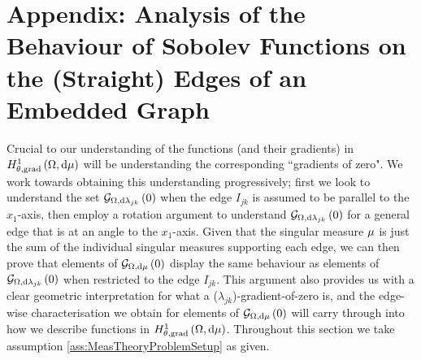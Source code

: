 \section{Appendix: Analysis of the Behaviour of Sobolev Functions on the (Straight) Edges of an Embedded Graph} \label{app:muAnalysis}
Crucial to our understanding of the functions (and their gradients) in $H^1_{\theta, \mathrm{grad}}\left( \Omega, \mathrm{d}\mu \right)$ will be understanding the corresponding ``gradients of zero".
We work towards obtaining this understanding progressively; first we look to understand the set $\mathcal{G}_{ \Omega, \mathrm{d}\lambda_{jk}}\left( 0 \right)$ when the edge $I_{jk}$ is assumed to be parallel to the $x_1$-axis, then employ a rotation argument to understand $\mathcal{G}_{ \Omega, \mathrm{d}\lambda_{jk}}\left( 0 \right)$ for a general edge that is at an angle to the $x_1$-axis.
Given that the singular measure $\mu$ is just the sum of the individual singular measures supporting each edge, we can then prove that elements of $\mathcal{G}_{ \Omega, \mathrm{d}\mu}\left( 0 \right)$ display the same behaviour as elements of $\mathcal{G}_{ \Omega, \mathrm{d}\lambda_{jk}}\left( 0 \right)$ when restricted to the edge $I_{jk}$.
This argument also provides us with a clear geometric interpretation for what a ($\lambda_{jk}$)-gradient-of-zero is, and the edge-wise characterisation we obtain for elements of $\mathcal{G}_{ \Omega, \mathrm{d}\mu}\left( 0 \right)$ will carry through into how we describe functions in $H^1_{\theta, \mathrm{grad}}\left( \Omega, \mathrm{d}\mu \right)$.
Throughout this section we take assumption \ref{ass:MeasTheoryProblemSetup} as given.

